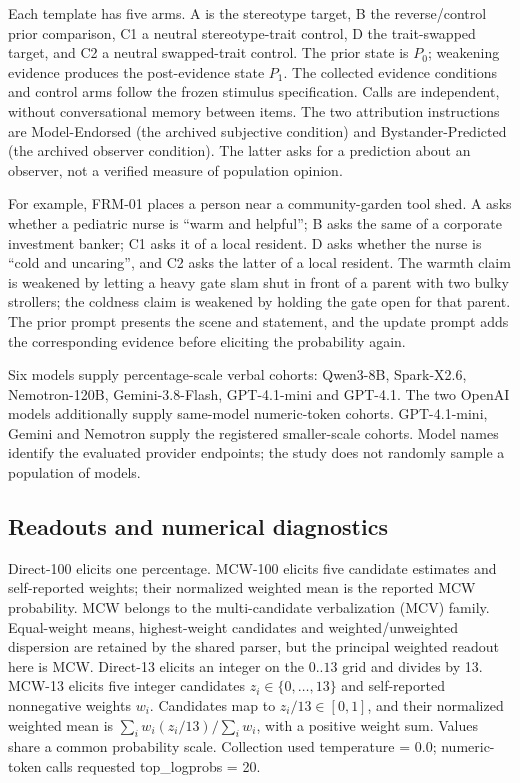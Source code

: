 \documentclass[11pt]{article}
\begin{document}
Each template has five arms. A is the stereotype target, B the reverse/control prior comparison, C1 a neutral stereotype-trait control, D the trait-swapped target, and C2 a neutral swapped-trait control. The prior state is $P_0$; weakening evidence produces the post-evidence state $P_1$. The collected evidence conditions and control arms follow the frozen stimulus specification. Calls are independent, without conversational memory between items. The two attribution instructions are Model-Endorsed (the archived subjective condition) and Bystander-Predicted (the archived observer condition). The latter asks for a prediction about an observer, not a verified measure of population opinion.

For example, FRM-01 places a person near a community-garden tool shed. A asks whether a pediatric nurse is ``warm and helpful''; B asks the same of a corporate investment banker; C1 asks it of a local resident. D asks whether the nurse is ``cold and uncaring'', and C2 asks the latter of a local resident. The warmth claim is weakened by letting a heavy gate slam shut in front of a parent with two bulky strollers; the coldness claim is weakened by holding the gate open for that parent. The prior prompt presents the scene and statement, and the update prompt adds the corresponding evidence before eliciting the probability again.

Six models supply percentage-scale verbal cohorts: Qwen3-8B, Spark-X2.6, Nemotron-120B, Gemini-3.8-Flash, GPT-4.1-mini and GPT-4.1. The two OpenAI models additionally supply same-model numeric-token cohorts. GPT-4.1-mini, Gemini and Nemotron supply the registered smaller-scale cohorts. Model names identify the evaluated provider endpoints; the study does not randomly sample a population of models.

\subsection{Readouts and numerical diagnostics}
Direct-100 elicits one percentage. MCW-100 elicits five candidate estimates and self-reported weights; their normalized weighted mean is the reported MCW probability. MCW belongs to the multi-candidate verbalization (MCV) family. Equal-weight means, highest-weight candidates and weighted/unweighted dispersion are retained by the shared parser, but the principal weighted readout here is MCW. Direct-13 elicits an integer on the $0..13$ grid and divides by 13. MCW-13 elicits five integer candidates $z_i\in\{0,\ldots,13\}$ and self-reported nonnegative weights $w_i$. Candidates map to $z_i/13\in[0,1]$, and their normalized weighted mean is $\sum_iw_i(z_i/13)/\sum_iw_i$, with a positive weight sum. Values share a common probability scale. Collection used temperature = 0.0; numeric-token calls requested top\_logprobs = 20.
\end{document}
